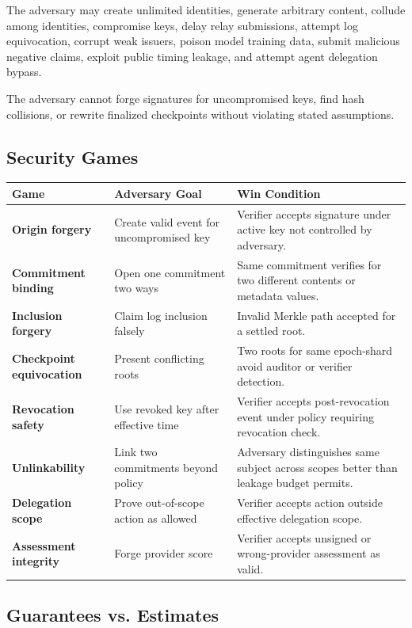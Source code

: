 \documentclass[11pt]{article}
\begin{document}
The adversary may create unlimited identities, generate arbitrary content, collude among identities, compromise keys, delay relay submissions, attempt log equivocation, corrupt weak issuers, poison model training data, submit malicious negative claims, exploit public timing leakage, and attempt agent delegation bypass.

The adversary cannot forge signatures for uncompromised keys, find hash collisions, or rewrite finalized checkpoints without violating stated assumptions.

\subsection{Security Games}

\begin{longtable}{>{\bfseries}p{} p{} p{}}
\toprule
Game & Adversary Goal & Win Condition \\
\midrule
Origin forgery & Create valid event for uncompromised key & Verifier accepts signature under active key not controlled by adversary. \\
Commitment binding & Open one commitment two ways & Same commitment verifies for two different contents or metadata values. \\
Inclusion forgery & Claim log inclusion falsely & Invalid Merkle path accepted for a settled root. \\
Checkpoint equivocation & Present conflicting roots & Two roots for same epoch-shard avoid auditor or verifier detection. \\
Revocation safety & Use revoked key after effective time & Verifier accepts post-revocation event under policy requiring revocation check. \\
Unlinkability & Link two commitments beyond policy & Adversary distinguishes same subject across scopes better than leakage budget permits. \\
Delegation scope & Prove out-of-scope action as allowed & Verifier accepts action outside effective delegation scope. \\
Assessment integrity & Forge provider score & Verifier accepts unsigned or wrong-provider assessment as valid. \\
\bottomrule
\end{longtable}

\subsection{Guarantees vs. Estimates}
\end{document}
